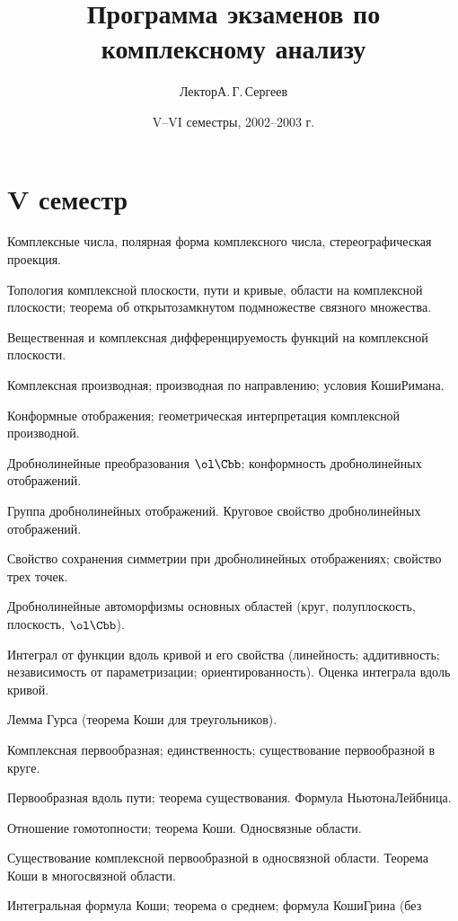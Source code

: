 \documentclass[a4paper]{article}
\title{Программа экзаменов по комплексному анализу}
\author{Лектор\т А.\,Г.\,Сергеев}
\date{V--VI семестры, 2002--2003 г.}
\begin{document}
\maketitle

\section*{V семестр}

\begin{nums}{-3}
\item Комплексные числа, полярная форма комплексного числа, стереографическая проекция.
\item Топология комплексной плоскости, пути и кривые, области на комплексной
плоскости; теорема об открыто\д замкнутом подмножестве связного множества.
\item Вещественная и комплексная дифференцируемость функций на комплексной
плоскости.
\item Комплексная производная; производная по направлению; условия Коши\ч Римана.
\item Конформные отображения; геометрическая интерпретация комплексной
производной.
\item Дробно\д линейные преобразования $\ol\Cbb$; конформность дробно\д линейных отображений.
\item Группа дробно\д линейных отображений. Круговое свойство дробно\д линейных
отображений.
\item Свойство сохранения симметрии при дробно\д линейных отображениях; свойство
трех точек.
\item Дробно\д линейные автоморфизмы основных областей (круг, полуплоскость,
плоскость, $\ol\Cbb$).
\item Интеграл от функции вдоль кривой и его свойства (линейность;
аддитивность; независимость от параметризации; ориентированность). Оценка
интеграла вдоль кривой.
\item Лемма Гурса (теорема Коши для треугольников).
\item Комплексная первообразная; единственность; существование первообразной в
круге.
\item Первообразная вдоль пути; теорема существования. Формула
Ньютона\ч Лейбница.
\item Отношение гомотопности; теорема Коши. Односвязные области.
\item Существование комплексной первообразной в односвязной области. Теорема
Коши в многосвязной области.
\item Интегральная формула Коши; теорема о среднем; формула Коши\ч Грина (без

\end{nums}
\end{document}

